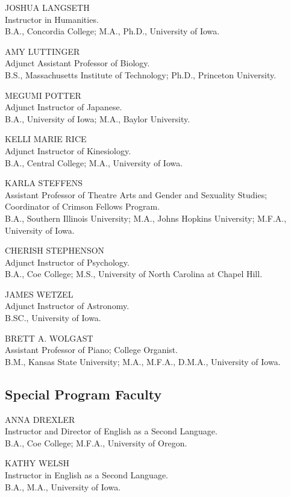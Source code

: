 \documentclass[
  letterpaper,
]{scrbook}
\begin{document}
JOSHUA LANGSETH\\
Instructor in Humanities.\\
B.A., Concordia College; M.A., Ph.D., University of Iowa.

AMY LUTTINGER\\
Adjunct Assistant Professor of Biology.\\
B.S., Massachusetts Institute of Technology; Ph.D., Princeton
University.

MEGUMI POTTER\\
Adjunct Instructor of Japanese.\\
B.A., University of Iowa; M.A., Baylor University.

KELLI MARIE RICE\\
Adjunct Instructor of Kinesiology.\\
B.A., Central College; M.A., University of Iowa.

KARLA STEFFENS\\
Assistant Professor of Theatre Arts and Gender and Sexuality Studies;
Coordinator of Crimson Fellows Program.\\
B.A., Southern Illinois University; M.A., Johns Hopkins University;
M.F.A., University of Iowa.

CHERISH STEPHENSON\\
Adjunct Instructor of Psychology.\\
B.A., Coe College; M.S., University of North Carolina at Chapel Hill.

JAMES WETZEL\\
Adjunct Instructor of Astronomy.\\
B.SC., University of Iowa.

BRETT A. WOLGAST\\
Assistant Professor of Piano; College Organist.\\
B.M., Kansas State University; M.A., M.F.A., D.M.A., University of Iowa.

\subsection{Special Program Faculty}\label{special-program-faculty}

ANNA DREXLER\\
Instructor and Director of English as a Second Language.\\
B.A., Coe College; M.F.A., University of Oregon.

KATHY WELSH\\
Instructor in English as a Second Language.\\
B.A., M.A., University of Iowa.
\end{document}
